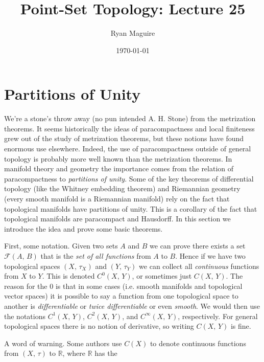 \documentclass{article}
\title{Point-Set Topology: Lecture 25}
\author{Ryan Maguire}
\date{\today}
\theoremstyle{plain}
\theoremstyle{normal}
\begin{document}
    \maketitle
    \section{Partitions of Unity}
        We're a stone's throw away (no pun intended A. H. Stone) from the
        metrization theorems. It seems historically the ideas of paracompactness
        and local finiteness grew out of the study of metrization
        theorems, but these notions have found enormous use elsewhere. Indeed,
        the use of paracompactness outside of general topology is probably more
        well known than the metrization theorems. In manifold theory and
        geometry the importance comes from the relation of paracompactness to
        \textit{partitions of unity}. Some of the key theorems of differential
        topology (like the Whitney embedding theorem) and Riemannian geometry
        (every smooth manifold is a Riemannian manifold) rely on the fact that
        topological manifolds have partitions of unity. This is a corollary of
        the fact that topological manifolds are paracompact and Hausdorff. In
        this section we introduce the idea and prove some basic theorems.
        \par\hfill\par
        First, some notation. Given two sets $A$ and $B$ we can prove there
        exists a set $\mathcal{F}(A,\,B)$ that is the
        \textit{set of all functions} from $A$ to $B$. Hence if we have two
        topological spaces $(X,\,\tau_{X})$ and $(Y,\,\tau_{Y})$ we can collect
        all \textit{continuous} functions from $X$ to $Y$. This is denoted
        $C^{0}(X,\,Y)$, or sometimes just $C(X,\,Y)$. The reason for the
        $0$ is that in some cases (i.e. smooth manifolds and topological vector
        spaces) it is possible to say a function from one topological space to
        another is \textit{differentiable} or \textit{twice differentiable} or
        even \textit{smooth}. We would then use the notations
        $C^{1}(X,\,Y)$,  $C^{2}(X,\,Y)$, and $C^{\infty}(X,\,Y)$, respectively.
        For general topological spaces there is no notion
        of derivative, so writing $C(X,\,Y)$ is fine.
        \par\hfill\par
        A word of warning. Some authors use $C(X)$ to denote continuous
        functions from $(X,\,\tau)$ to $\mathbb{R}$, where $\mathbb{R}$ has the
\end{document}
